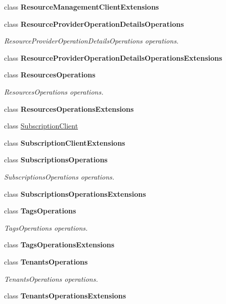 \begin{DoxyCompactItemize}
\item 
class {\bfseries Resource\+Management\+Client\+Extensions}
\item 
class {\bfseries Resource\+Provider\+Operation\+Details\+Operations}
\begin{DoxyCompactList}\small\item\em Resource\+Provider\+Operation\+Details\+Operations operations. \end{DoxyCompactList}\item 
class {\bfseries Resource\+Provider\+Operation\+Details\+Operations\+Extensions}
\item 
class {\bfseries Resources\+Operations}
\begin{DoxyCompactList}\small\item\em Resources\+Operations operations. \end{DoxyCompactList}\item 
class {\bfseries Resources\+Operations\+Extensions}
\item 
class \hyperlink{class_microsoft_1_1_azure_1_1_management_1_1_resources_1_1_subscription_client}{Subscription\+Client}
\item 
class {\bfseries Subscription\+Client\+Extensions}
\item 
class {\bfseries Subscriptions\+Operations}
\begin{DoxyCompactList}\small\item\em Subscriptions\+Operations operations. \end{DoxyCompactList}\item 
class {\bfseries Subscriptions\+Operations\+Extensions}
\item 
class {\bfseries Tags\+Operations}
\begin{DoxyCompactList}\small\item\em Tags\+Operations operations. \end{DoxyCompactList}\item 
class {\bfseries Tags\+Operations\+Extensions}
\item 
class {\bfseries Tenants\+Operations}
\begin{DoxyCompactList}\small\item\em Tenants\+Operations operations. \end{DoxyCompactList}\item 
class {\bfseries Tenants\+Operations\+Extensions}
\end{DoxyCompactItemize}
